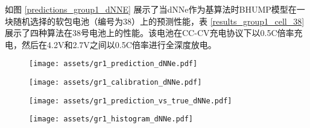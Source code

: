\documentclass{article}
\begin{document}
如图 \ref{predictions_group1_dNNE} 展示了当dNNe作为基算法时BHUMP模型在一块随机选择的软包电池（编号为38）上的预测性能，表 \ref{results_group1_cell_38} 展示了四种算法在38号电池上的性能。该电池在CC-CV充电协议下以0.5C倍率充电，然后在4.2V和2.7V之间以0.5C倍率进行全深度放电。

\begin{figure*}[h!]
  \centering
\begin{subfigure}[b]{.55\textwidth}
     \centering
     \caption{}
                    \texttt{[image: assets/gr1\_prediction\_dNNe.pdf]}
     \label{pred_group1_dNNe}
\end{subfigure}%
\begin{subfigure}[b]{.3\textwidth}
     \centering
     \caption{}
                    \texttt{[image: assets/gr1\_calibration\_dNNe.pdf]}
     \label{calibration_group1_dNNE}
  \end{subfigure}%
  \hfill 
  \begin{subfigure}[b]{.55\textwidth}
     \centering
     \caption{}
                    \texttt{[image: assets/gr1\_prediction\_vs\_true\_dNNe.pdf]}
     \label{prediction_vs_true_dNNe_group1}
\end{subfigure}%
\begin{subfigure}[b]{.3\textwidth}
     \centering
     \caption{}
                    \texttt{[image: assets/gr1\_histogram\_dNNe.pdf]}
     \label{hist_group1_dNNE}
  \end{subfigure}%
    \hfill
  \caption{\textbf{dNNe作为基算法在38号电池上的预测结果} \textbf{\protect{}} dNNe预测的容量-时间曲线，\textbf{\protect{}} dNNE算法标定结果, \textbf{\protect{}} dNNe预测值和真实值对照, \textbf{\protect{}} 百分比误差柱状图（其中$y^*$为真实容量，$\hat{y}^*$为预测容量）。} 
  \label{predictions_group1_dNNE}
 \end{figure*}

\begin{table}[h!]
\centering
{}
\caption{第一组数据的平均预测性能}
\label{results_group1}
\end{table}
\end{document}
